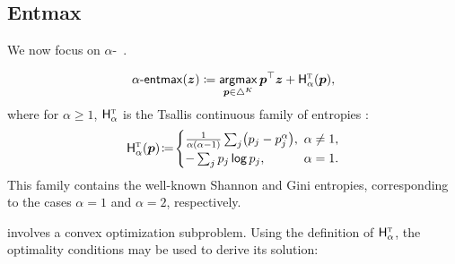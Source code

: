 \subsection{Entmax}\label{sec:entmax_bg}

We now focus on $\alpha$-\entmaxtext~\citep{blondel2019learning,entmax}.

\begin{definition}[$\aentmax$]
    \begin{equation}\label{eq:define_entmax}
        \mathop{\mathsf{\alpha}\textnormal{-}\mathsf{entmax}}(\bm{z}) \coloneqq
        \operatorname*{\mathsf{argmax}}_{\bm{p} \in \triangle^K} \bm{p}^\top\bm{z} + \mathsf{H}^{{\textsc{t}}}_{\alpha}(\bm{p}),
    \end{equation}
    where for $\alpha\geq1$,
    $\mathsf{H}^{{\textsc{t}}}_\alpha$ is the Tsallis continuous family of entropies
    \citep{Tsallis1988}:
    \begin{equation}\label{eq:tsallisdef}
        \HHt_{\alpha}(\bm{p})\!\coloneqq\!
        \begin{cases}
            \frac{1}{\alpha(\alpha-1)}\sum_j\!\left(p_j - p_j^\alpha\right)\!, &
            \!\!\!\alpha \ne 1,                                                  \\
            -\sum_j \pp_j \log \pp_j,                                          &
            \!\!\!\alpha = 1.
        \end{cases}
    \end{equation}
    This family contains the well-known Shannon and Gini entropies,
    corresponding to the cases $\alpha=1$ and $\alpha=2$, respectively.
\end{definition}

 involves a convex optimization subproblem. Using the
definition of $\mathsf{H}^{{\textsc{t}}}_\alpha$, the optimality conditions may be used to derive its solution:


